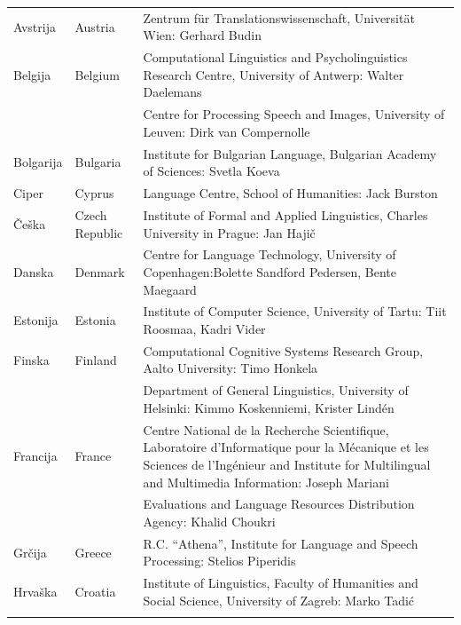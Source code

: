\small
\begin{longtable}{@{}llp{113mm}@{}}
  Avstrija & \textcolor{grey1}{Austria} & Zentrum für Translationswissenschaft, Universität Wien: Gerhard Budin\\ \addlinespace 
  Belgija & \textcolor{grey1}{Belgium} & Computational Linguistics and Psycholinguistics Research Centre, University of Antwerp: Walter Daelemans\\ \addlinespace
  & & Centre for Processing Speech and Images, University of Leuven: Dirk van Compernolle \\ \addlinespace
  Bolgarija & \textcolor{grey1}{Bulgaria} & Institute for Bulgarian Language, Bulgarian Academy of Sciences: Svetla Koeva \\ \addlinespace
  Ciper & \textcolor{grey1}{Cyprus} & Language Centre, School of Humanities: Jack Burston \\ \addlinespace
  Češka & \textcolor{grey1}{Czech Republic} & Institute of Formal and Applied Linguistics, Charles University in Prague: Jan Hajič \\ \addlinespace
  Danska &  \textcolor{grey1}{Denmark} & Centre for Language Technology, University of Copenhagen:\newline Bolette Sandford Pedersen, Bente Maegaard\\ \addlinespace
  Estonija & \textcolor{grey1}{Estonia} & Institute of Computer Science, University of Tartu: Tiit Roosmaa, Kadri Vider\\ \addlinespace
  Finska & \textcolor{grey1}{Finland} & Computational Cognitive Systems Research Group, Aalto University: Timo Honkela\\ \addlinespace
  & & Department of General Linguistics, University of Helsinki: Kimmo Koskenniemi, Krister Lindén \\ \addlinespace
  Francija & \textcolor{grey1}{France} & Centre National de la Recherche Scientifique, Laboratoire d'Informatique pour la Mécanique et les Sciences de l'Ingénieur and Institute for Multilingual and Multimedia Information: Joseph Mariani \\ \addlinespace
  & & Evaluations and Language Resources Distribution Agency: Khalid Choukri\\ \addlinespace 
  Grčija & \textcolor{grey1}{Greece} & R.C. ``Athena'', Institute for Language and Speech Processing: Stelios Piperidis\\ \addlinespace
  Hrvaška & \textcolor{grey1}{Croatia} & Institute of Linguistics, Faculty of Humanities and Social Science, University of Zagreb: Marko Tadić \\ \addlinespace

\end{longtable}
